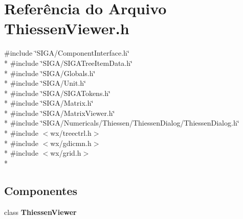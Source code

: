 \section{Referência do Arquivo Thiessen\+Viewer.\+h}
\label{_thiessen_viewer_8h}
{\ttfamily \#include \char`\"{}S\+I\+G\+A/\+Component\+Interface.\+h\char`\"{}}\\*
{\ttfamily \#include \char`\"{}S\+I\+G\+A/\+S\+I\+G\+A\+Tree\+Item\+Data.\+h\char`\"{}}\\*
{\ttfamily \#include \char`\"{}S\+I\+G\+A/\+Globals.\+h\char`\"{}}\\*
{\ttfamily \#include \char`\"{}S\+I\+G\+A/\+Unit.\+h\char`\"{}}\\*
{\ttfamily \#include \char`\"{}S\+I\+G\+A/\+S\+I\+G\+A\+Tokens.\+h\char`\"{}}\\*
{\ttfamily \#include \char`\"{}S\+I\+G\+A/\+Matrix.\+h\char`\"{}}\\*
{\ttfamily \#include \char`\"{}S\+I\+G\+A/\+Matrix\+Viewer.\+h\char`\"{}}\\*
{\ttfamily \#include \char`\"{}S\+I\+G\+A/\+Numericals/\+Thiessen/\+Thiessen\+Dialog/\+Thiessen\+Dialog.\+h\char`\"{}}\\*
{\ttfamily \#include $<$wx/treectrl.\+h$>$}\\*
{\ttfamily \#include $<$wx/gdicmn.\+h$>$}\\*
{\ttfamily \#include $<$wx/grid.\+h$>$}\\*
\subsection*{Componentes}
\begin{DoxyCompactItemize}
\item 
class {\bf Thiessen\+Viewer}
\end{DoxyCompactItemize}
